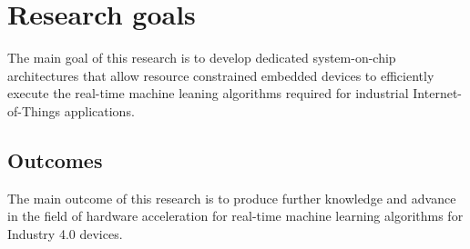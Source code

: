 \section{Research goals}
The main goal of this research is to develop dedicated system-on-chip architectures that allow resource constrained embedded devices to efficiently execute the real-time machine leaning algorithms required for industrial Internet-of-Things applications.
\subsection{Outcomes}
The main outcome of this research is to produce further knowledge and advance in the field of hardware acceleration for real-time machine learning algorithms for Industry 4.0 devices.
